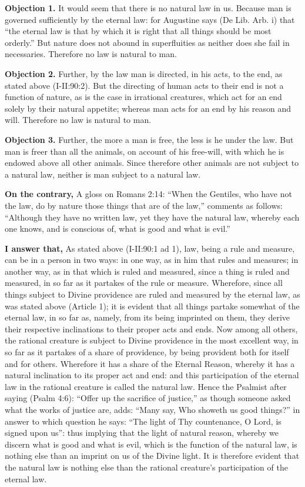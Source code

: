 
\textbf{Objection 1.} It would seem that there is no natural law in us. Because man is governed sufficiently by the eternal law: for Augustine says (De Lib. Arb. i) that ``the eternal law is that by which it is right that all things should be most orderly.'' But nature does not abound in superfluities as neither does she fail in necessaries. Therefore no law is natural to man.

\textbf{Objection 2.} Further, by the law man is directed, in his acts, to the end, as stated above (I-II:90:2). But the directing of human acts to their end is not a function of nature, as is the case in irrational creatures, which act for an end solely by their natural appetite; whereas man acts for an end by his reason and will. Therefore no law is natural to man.

\textbf{Objection 3.} Further, the more a man is free, the less is he under the law. But man is freer than all the animals, on account of his free-will, with which he is endowed above all other animals. Since therefore other animals are not subject to a natural law, neither is man subject to a natural law.

\textbf{On the contrary,} A gloss on Romans 2:14: ``When the Gentiles, who have not the law, do by nature those things that are of the law,'' comments as follows: ``Although they have no written law, yet they have the natural law, whereby each one knows, and is conscious of, what is good and what is evil.''

\textbf{I answer that,} As stated above (I-II:90:1 ad 1), law, being a rule and measure, can be in a person in two ways: in one way, as in him that rules and measures; in another way, as in that which is ruled and measured, since a thing is ruled and measured, in so far as it partakes of the rule or measure. Wherefore, since all things subject to Divine providence are ruled and measured by the eternal law, as was stated above (Article 1); it is evident that all things partake somewhat of the eternal law, in so far as, namely, from its being imprinted on them, they derive their respective inclinations to their proper acts and ends. Now among all others, the rational creature is subject to Divine providence in the most excellent way, in so far as it partakes of a share of providence, by being provident both for itself and for others. Wherefore it has a share of the Eternal Reason, whereby it has a natural inclination to its proper act and end: and this participation of the eternal law in the rational creature is called the natural law. Hence the Psalmist after saying (Psalm 4:6): ``Offer up the sacrifice of justice,'' as though someone asked what the works of justice are, adds: ``Many say, Who showeth us good things?'' in answer to which question he says: ``The light of Thy countenance, O Lord, is signed upon us'': thus implying that the light of natural reason, whereby we discern what is good and what is evil, which is the function of the natural law, is nothing else than an imprint on us of the Divine light. It is therefore evident that the natural law is nothing else than the rational creature's participation of the eternal law.

